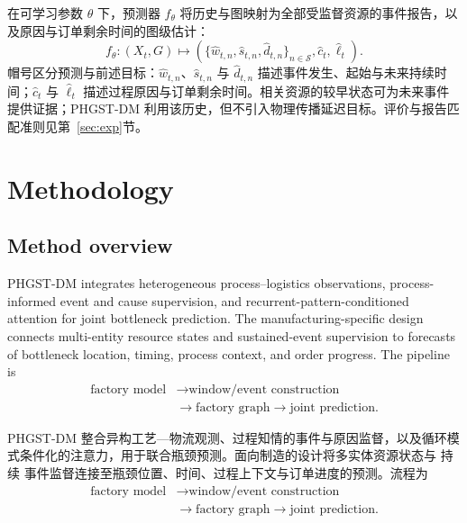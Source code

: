 \documentclass[a4paper,fleqn]{cas-dc}
\newcommand{\zhpara}[1]{%
  \par\begingroup\small\color{black!72}\noindent #1\par\endgroup}
\begin{document}
\zhpara{在可学习参数 $\theta$ 下，预测器 $f_{\theta}$ 将历史与图映射为全部受监督资源的事件报告，以及原因与订单剩余时间的图级估计：
\begin{equation}
f_{\theta}:(X_t,G)\longmapsto
\left(
\{\hat w_{t,n},\hat s_{t,n},\hat d_{t,n}\}_{n\in\mathcal{S}},
\hat c_t,\hat\ell_t
\right).
\end{equation}
帽号区分预测与前述目标：$\hat w_{t,n}$、$\hat s_{t,n}$ 与 $\hat d_{t,n}$ 描述事件发生、起始与未来持续时间；$\hat c_t$ 与 $\hat\ell_t$ 描述过程原因与订单剩余时间。相关资源的较早状态可为未来事件提供证据；PHGST-DM 利用该历史，但不引入物理传播延迟目标。评价与报告匹配准则见第~\ref{sec:exp}节。}


\section{Methodology} \label{sec:method}

\subsection{Method overview}

PHGST-DM integrates heterogeneous process--logistics observations, process-informed event and cause supervision, and recurrent-pattern-conditioned attention for joint bottleneck prediction. The manufacturing-specific design connects multi-entity resource states and sustained-event supervision to forecasts of bottleneck location, timing, process context, and order progress. The pipeline is
\begin{equation}
\begin{aligned}
\text{factory model}&\rightarrow\text{window/event construction}\\
&\rightarrow\text{factory graph}\rightarrow\text{joint prediction}.
\end{aligned}
\end{equation}

\zhpara{PHGST-DM 整合异构工艺—物流观测、过程知情的事件与原因监督，以及循环模式条件化的注意力，用于联合瓶颈预测。面向制造的设计将多实体资源状态与 持续 事件监督连接至瓶颈位置、时间、过程上下文与订单进度的预测。流程为
\begin{equation}
\begin{aligned}
\text{factory model}&\rightarrow\text{window/event construction}\\
&\rightarrow\text{factory graph}\rightarrow\text{joint prediction}.
\end{aligned}
\end{equation}}
\end{document}
